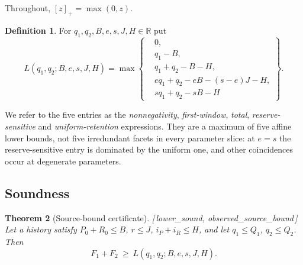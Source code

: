 \documentclass[11pt]{article}
\theoremstyle{plain}
\newtheorem{theorem}{Theorem}[section]
\theoremstyle{definition}
\newtheorem{definition}[theorem]{Definition}
\theoremstyle{remark}
\newcommand{\pos}[1]{\left[#1\right]_{+}}
\newcommand{\R}{\mathbb{R}}
\newcommand{\leanref}[1]{{\normalfont\sffamily\footnotesize[\,#1\,]}}
\newcommand{\Lc}{L}
\begin{document}
Throughout, $\pos{z}=\max(0,z)$.

\begin{definition}\label{def:L}
For $q_1,q_2,B,e,s,J,H\in\R$ put
\begin{equation}
 \Lc(q_1,q_2;B,e,s,J,H)=\max\left\{
 \begin{aligned}
 &0,\\
 &q_1-B,\\
 &q_1+q_2-B-H,\\
 &e q_1+q_2-eB-(s-e)J-H,\\
 &s q_1+q_2-sB-H
 \end{aligned}\right\} .
 \label{eq:facets}
\end{equation}
\end{definition}

We refer to the five entries as the \emph{nonnegativity}, \emph{first-window},
\emph{total}, \emph{reserve-sensitive} and \emph{uniform-retention}
expressions. They are a maximum of five affine lower bounds, not five
irredundant facets in every parameter slice: at $e=s$ the reserve-sensitive
entry is dominated by the uniform one, and other coincidences occur at
degenerate parameters.

\subsection{Soundness}

\begin{theorem}[Source-bound certificate]\label{thm:sound}
\leanref{lower\_sound, observed\_source\_bound}
Let a history satisfy $P_0+R_0\le B$, $r\le J$, $i_P+i_R\le H$, and let
$q_1\le Q_1$, $q_2\le Q_2$. Then
\[
 F_1+F_2\ \ge\ \Lc(q_1,q_2;B,e,s,J,H).
\]
\end{theorem}
\end{document}
